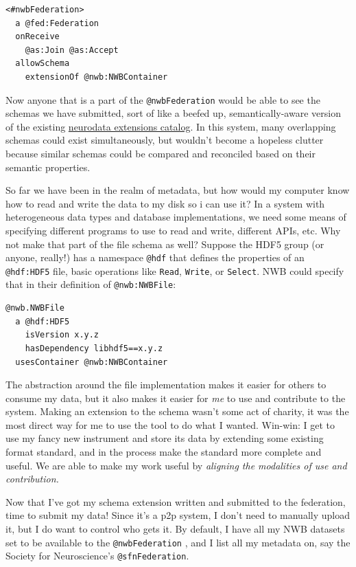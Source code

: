 \documentclass[10pt]{article}
\begin{document}
\begin{multicols}{2}
\begin{verbatim}
<#nwbFederation>
  a @fed:Federation
  onReceive
    @as:Join @as:Accept
  allowSchema
    extensionOf @nwb:NWBContainer
\end{verbatim}

Now anyone that is a part of the \texttt{@nwbFederation} would be able
to see the schemas we have submitted, sort of like a beefed up,
semantically-aware version of the existing
\href{https://nwb-extensions.github.io/}{neurodata extensions catalog}.
In this system, many overlapping schemas could exist simultaneously, but
wouldn't become a hopeless clutter because similar schemas could be
compared and reconciled based on their semantic properties.

So far we have been in the realm of metadata, but how would my computer
know how to read and write the data to my disk so i can use it? In a
system with heterogeneous data types and database implementations, we
need some means of specifying different programs to use to read and
write, different APIs, etc. Why not make that part of the file schema as
well? Suppose the HDF5 group (or anyone, really!) has a namespace
\texttt{@hdf} that defines the properties of an \texttt{@hdf:HDF5} file,
basic operations like \texttt{Read}, \texttt{Write}, or \texttt{Select}.
NWB could specify that in their definition of \texttt{@nwb:NWBFile}:

\begin{verbatim}
@nwb.NWBFile
  a @hdf:HDF5
    isVersion x.y.z
    hasDependency libhdf5==x.y.z
  usesContainer @nwb:NWBContainer
\end{verbatim}

The abstraction around the file implementation makes it easier for
others to consume my data, but it also makes it easier for \emph{me} to
use and contribute to the system. Making an extension to the schema
wasn't some act of charity, it was the most direct way for me to use the
tool to do what I wanted. Win-win: I get to use my fancy new instrument
and store its data by extending some existing format standard, and in
the process make the standard more complete and useful. We are able to
make my work useful by \emph{aligning the modalities of use and
contribution.}

Now that I've got my schema extension written and submitted to the
federation, time to submit my data! Since it's a p2p system, I don't
need to manually upload it, but I do want to control who gets it. By
default, I have all my NWB datasets set to be available to the
\texttt{@nwbFederation} , and I list all my metadata on, say the Society
for Neuroscience's \texttt{@sfnFederation}.


\end{multicols}
\end{document}
